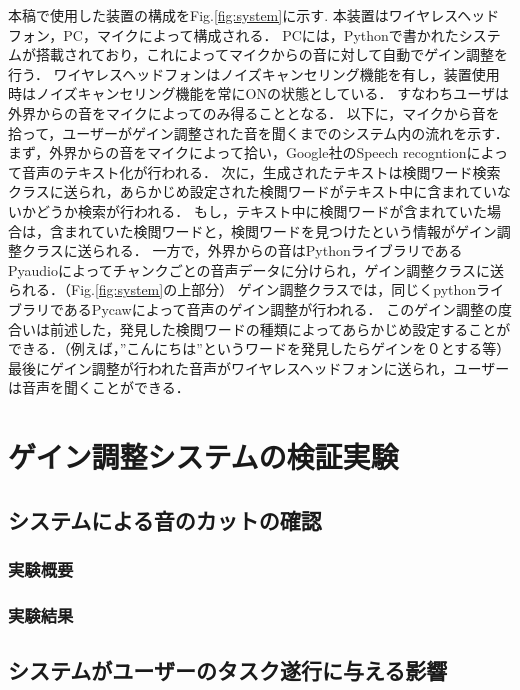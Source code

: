 \documentclass[a4paper]{jarticle}
\begin{document}
本稿で使用した装置の構成をFig.\ref{fig:system}に示す.
本装置はワイヤレスヘッドフォン，PC，マイクによって構成される．
PCには，Pythonで書かれたシステムが搭載されており，これによってマイクからの音に対して自動でゲイン調整を行う．
ワイヤレスヘッドフォンはノイズキャンセリング機能を有し，装置使用時はノイズキャンセリング機能を常にONの状態としている．
すなわちユーザは外界からの音をマイクによってのみ得ることとなる．
以下に，マイクから音を拾って，ユーザーがゲイン調整された音を聞くまでのシステム内の流れを示す．
まず，外界からの音をマイクによって拾い，Google社のSpeech recogntionによって音声のテキスト化が行われる．
次に，生成されたテキストは検閲ワード検索クラスに送られ，あらかじめ設定された検閲ワードがテキスト中に含まれていないかどうか検索が行われる．
もし，テキスト中に検閲ワードが含まれていた場合は，含まれていた検閲ワードと，検閲ワードを見つけたという情報がゲイン調整クラスに送られる．
一方で，外界からの音はPythonライブラリであるPyaudioによってチャンクごとの音声データに分けられ，ゲイン調整クラスに送られる．（Fig.\ref{fig:system}の上部分）
ゲイン調整クラスでは，同じくpythonライブラリであるPycawによって音声のゲイン調整が行われる．
このゲイン調整の度合いは前述した，発見した検閲ワードの種類によってあらかじめ設定することができる．（例えば，”こんにちは”というワードを発見したらゲインを０とする等）
最後にゲイン調整が行われた音声がワイヤレスヘッドフォンに送られ，ユーザーは音声を聞くことができる．

\section{ゲイン調整システムの検証実験}
\subsection{システムによる音のカットの確認}
\subsubsection{実験概要}
\subsubsection{実験結果}
\subsection{システムがユーザーのタスク遂行に与える影響}
\end{document}
